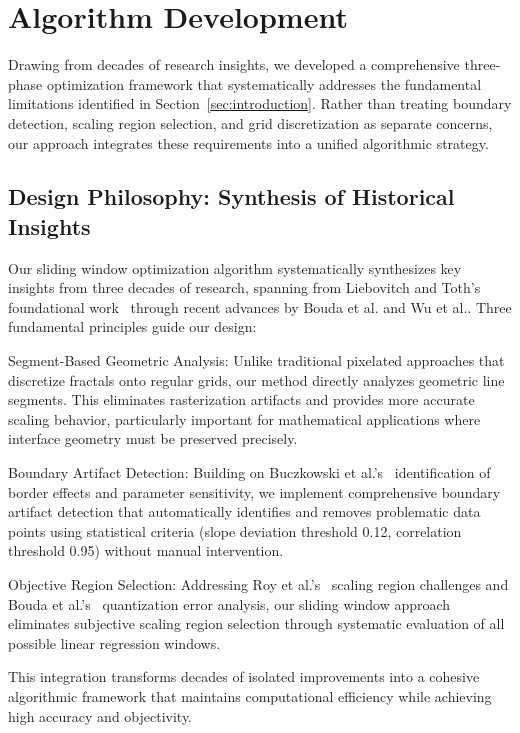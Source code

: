 \documentclass[preprint,12pt]{elsarticle}
\def\textbf#1{#1}%
\begin{document}
\section{Algorithm Development}
\label{sec:algorithm}

Drawing from decades of research insights, we developed a comprehensive three-phase optimization framework that systematically addresses the fundamental limitations identified in Section~\ref{sec:introduction}. Rather than treating boundary detection, scaling region selection, and grid discretization as separate concerns, our approach integrates these requirements into a unified algorithmic strategy.

\subsection{Design Philosophy: Synthesis of Historical Insights}

Our sliding window optimization algorithm systematically synthesizes key insights from three decades of research, spanning from Liebovitch and Toth's foundational work~\cite{liebovitch1989} through recent advances by Bouda et al.\cite{bouda2016} and Wu et al.\cite{wu2020}. Three fundamental principles guide our design:

\textbf{Segment-Based Geometric Analysis}: Unlike traditional pixelated approaches that discretize fractals onto regular grids, our method directly analyzes geometric line segments. This eliminates rasterization artifacts and provides more accurate scaling behavior, particularly important for mathematical applications where interface geometry must be preserved precisely.

\textbf{Boundary Artifact Detection}: Building on Buczkowski et al.'s~\cite{buczkowski1998} identification of border effects and parameter sensitivity, we implement comprehensive boundary artifact detection that automatically identifies and removes problematic data points using statistical criteria (slope deviation threshold 0.12, correlation threshold 0.95) without manual intervention.

\textbf{Objective Region Selection}: Addressing Roy et al.'s~\cite{roy2007} scaling region challenges and Bouda et al.'s~\cite{bouda2016} quantization error analysis, our sliding window approach eliminates subjective scaling region selection through systematic evaluation of all possible linear regression windows.

This integration transforms decades of isolated improvements into a cohesive algorithmic framework that maintains computational efficiency while achieving high accuracy and objectivity.
\end{document}
